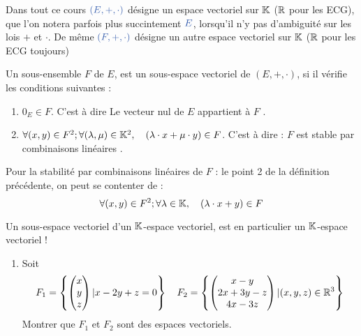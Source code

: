 Dans tout ce cours $\textcolor{gold2}{(E,+,\cdot)}$ désigne un espace vectoriel sur $\mathbb{K}$ ($\mathbb{R}$ pour les ECG), que l'on notera parfois plus succintement $\textcolor{gold2}{E}$, lorsqu'il n'y pas d'ambiguité sur les lois $+$ et $\cdot$. De même $\textcolor{gold2}{(F,+,\cdot)}$ désigne un autre espace vectoriel sur $\mathbb{K}$ ($\mathbb{R}$ pour les ECG toujours)
	
		
\Def
{ 
	\label{1908171115}
	Un sous-ensemble $F$ de $E$, est un \textcolor{gold2}{sous-espace vectoriel}  de $(E,+,\cdot)$, si il vérifie les conditions suivantes :
	\begin{enumerate}
		\item $0_E \in F$. C'est à dire \og Le vecteur nul de $E$ appartient à $F$ \fg.
		\item $\forall (x,y) \in F^2; \forall (\lambda, \mu) \in \mathbb{K}^2, \quad (\lambda \cdot x + \mu \cdot y) \in F$. C'est à dire :  \og $F$ est stable par combinaisons linéaires \fg.
	\end{enumerate}
}

	
\Prop
{
	Pour la stabilité par combinaisons linéaires de $F$ : le point \textcolor{gold2}{2} de la définition précédente, on peut se contenter de : 
	\[ 
		\forall (x,y) \in F^2; \forall \lambda \in \mathbb{K}, \quad (\lambda \cdot x +  y) \in F
	\]
}
	
\Thm
{
		Un sous-espace vectoriel d'un $\mathbb{K}$-espace vectoriel, est en particulier un $\mathbb{K}$-espace vectoriel !
}
	
	
\begin{exo}
	\begin{enumerate}
		\item Soit 
		\[
			F_1 = \left\{ \begin{pmatrix} x\\y\\z \end{pmatrix} \vert x-2y +z =0 \right\} \quad F_2  = \left\{ \begin{pmatrix} x-y \\2x +3y-z \\4x- 3z \end{pmatrix} \vert (x,y,z) \in \mathbb{R}^3 \right\} 
		\]
		Montrer que $F_1$ et $F_2$ sont des espaces	vectoriels.
	\end{enumerate}
\end{exo}


